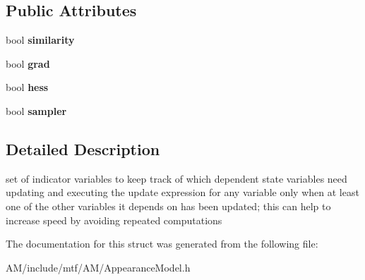 \subsection*{Public Attributes}
\begin{DoxyCompactItemize}
\item 
\hypertarget{structAMStatus_a31496e83632ea2df36b2236aae6936d6}{bool {\bfseries similarity}}\label{structAMStatus_a31496e83632ea2df36b2236aae6936d6}

\item 
\hypertarget{structAMStatus_a52366a59d56c772d8c12e1cbd6a40ae5}{bool {\bfseries grad}}\label{structAMStatus_a52366a59d56c772d8c12e1cbd6a40ae5}

\item 
\hypertarget{structAMStatus_ae4f44ba5f170022bacdec857f4d450e8}{bool {\bfseries hess}}\label{structAMStatus_ae4f44ba5f170022bacdec857f4d450e8}

\item 
\hypertarget{structAMStatus_a39fb50fa4fd243622b17956761da42d8}{bool {\bfseries sampler}}\label{structAMStatus_a39fb50fa4fd243622b17956761da42d8}

\end{DoxyCompactItemize}


\subsection{Detailed Description}
set of indicator variables to keep track of which dependent state variables need updating and executing the update expression for any variable only when at least one of the other variables it depends on has been updated; this can help to increase speed by avoiding repeated computations 

The documentation for this struct was generated from the following file\-:\begin{DoxyCompactItemize}
\item 
A\-M/include/mtf/\-A\-M/Appearance\-Model.\-h\end{DoxyCompactItemize}
